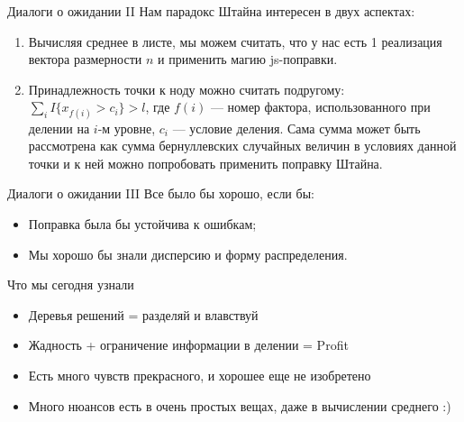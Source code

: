 \documentclass[14pt, fleqn, xcolor={dvipsnames, table}]{beamer}
\begin{document}
\begin{frame}{Диалоги о ожидании II} 
Нам парадокс Штайна интересен в двух аспектах:
\begin{enumerate}
  \item Вычисляя среднее в листе, мы можем считать, что у нас есть 1 реализация вектора размерности $n$ и применить магию js-поправки.
  \item Принадлежность точки к ноду можно считать подругому: $\sum_i I\{x_{f(i)} > c_i\} > l$, где $f(i)$ --- номер фактора, использованного при делении на $i$-м уровне, $c_i$ --- условие деления. Сама сумма может быть рассмотрена как сумма бернуллевских случайных величин в условиях данной точки и к ней можно попробовать применить поправку Штайна.
\end{enumerate}
\end{frame}

\begin{frame}{Диалоги о ожидании III} %
Все было бы хорошо, если бы:
\begin{itemize}
  \item Поправка была бы устойчива к ошибкам; %
  \item Мы хорошо бы знали дисперсию и форму распределения.
\end{itemize}
\end{frame}



\begin{frame}{Что мы сегодня узнали}
\begin{itemize}
  \item Деревья решений = разделяй и влавствуй
  \item Жадность + ограничение информации в делении = Profit
  \item Есть много чувств прекрасного, и хорошее еще не изобретено
  \item Много нюансов есть в очень простых вещах, даже в вычислении среднего :)
\end{itemize}
\end{frame}
\end{document}
